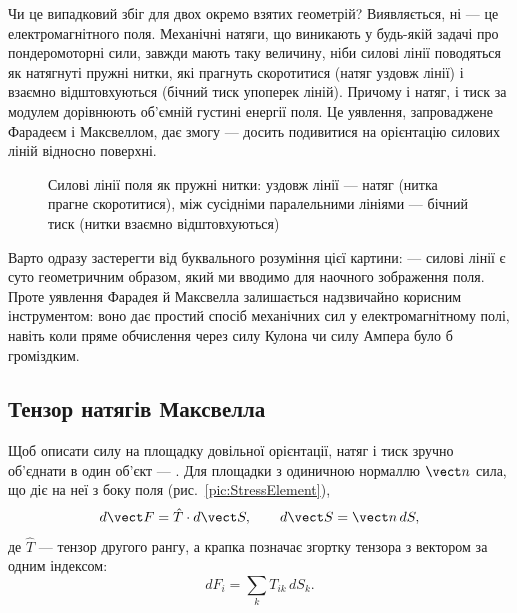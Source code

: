 Чи це випадковий збіг для двох окремо взятих геометрій? Виявляється, ні --- це  електромагнітного поля.
Механічні натяги, що виникають у будь-якій задачі про пондеромоторні сили, завжди мають таку величину, ніби силові лінії поводяться як
натягнуті пружні нитки, які прагнуть скоротитися (натяг уздовж лінії) і взаємно відштовхуються (бічний тиск упоперек ліній). Причому і натяг,
і тиск за модулем дорівнюють об'ємній густині енергії поля. Це уявлення, запроваджене Фарадеєм і Максвеллом, дає змогу  --- досить подивитися на орієнтацію силових ліній відносно поверхні.

\begin{figure}[h!]\centering
	\caption{Силові лінії поля як пружні нитки: уздовж лінії --- натяг (нитка прагне скоротитися), між сусідніми паралельними
		лініями --- бічний тиск (нитки взаємно відштовхуються)\label{pic:FieldLinesTension}}
\end{figure}

\begin{Attention}
	Варто одразу застерегти від буквального розуміння цієї картини:  --- силові лінії
	є суто геометричним образом, який ми вводимо для наочного зображення поля. Проте уявлення Фарадея й Максвелла залишається надзвичайно
	корисним інструментом: воно дає простий спосіб  механічних сил у електромагнітному полі, навіть коли пряме
	обчислення через силу Кулона чи силу Ампера було б громіздким.
\end{Attention}

\subsection*{Тензор натягів Максвелла}

Щоб описати силу на площадку довільної орієнтації, натяг і тиск зручно об'єднати в один об'єкт --- . Для
площадки з одиничною нормаллю $\vect n$ сила, що діє на неї з боку поля (рис.~\ref{pic:StressElement}),
\begin{equation}\label{eq:StressDefinition}
	d\vect F = \hat{T}\cdot d\vect S, \qquad d\vect S = \vect n\,dS,
\end{equation}
де $\hat{T}$ --- тензор другого рангу, а крапка позначає згортку тензора з вектором за одним індексом:
\begin{equation}\label{eq:StressComponent}
	dF_i = \sum_k T_{ik}\,dS_k.
\end{equation}


